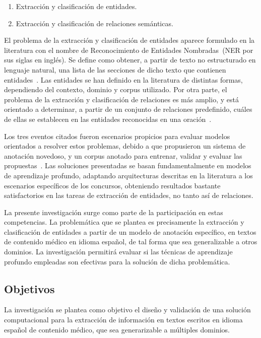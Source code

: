 \begin{enumerate}
	\item Extracción y clasificación de entidades.
	\item Extracción y clasificación de relaciones semánticas.
\end{enumerate}

El problema de la extracción y clasificación de entidades aparece formulado en la literatura con el nombre de Reconocimiento de Entidades Nombradas~(NER por sus siglas en inglés).
Se define como obtener, a partir de texto no estructurado en lenguaje natural, una lista de las secciones de dicho texto que contienen entidades~\cite{ehealthkd19_overview, nadeau2007survey}.
Las entidades se han definido en la literatura de distintas formas, dependiendo del contexto, dominio y corpus utilizado.
Por otra parte, el problema de la extracción y clasificación de relaciones es más amplio, y está orientado a determinar, a partir de un conjunto de relaciones predefinido, cuáles de ellas se establecen en las entidades reconocidas en una oración~\cite{ehealthkd19_overview, kumar2017survey}.

Los tres eventos citados fueron escenarios propicios para evaluar modelos orientados a resolver estos problemas, debido a que propusieron un sistema de anotación novedoso, y un corpus anotado para entrenar, validar y evaluar las propuestas~\cite{piad2019corpus}.
Las soluciones presentadas se basan fundamentalmente en modelos de aprendizaje profundo, adaptando arquitecturas descritas en la literatura a los escenarios específicos de los concursos, obteniendo resultados bastante satisfactorios en las tareas de extracción de entidades, no tanto así de relaciones.

La presente investigación surge como parte de la participación en estas competencias.
La problemática que se plantea es precisamente la extracción y clasificación de entidades a partir de un modelo de anotación específico, en textos de contenido médico en idioma español, de tal forma que sea generalizable a otros dominios.
La investigación permitirá evaluar si las técnicas de aprendizaje profundo empleadas son efectivas para la solución de dicha problemática.


\subsection*{Objetivos}

La investigación se plantea como objetivo el diseño y validación de una solución computacional para la extracción de información en textos escritos en idioma español de contenido médico, que sea generarizable a múltiples dominios.

